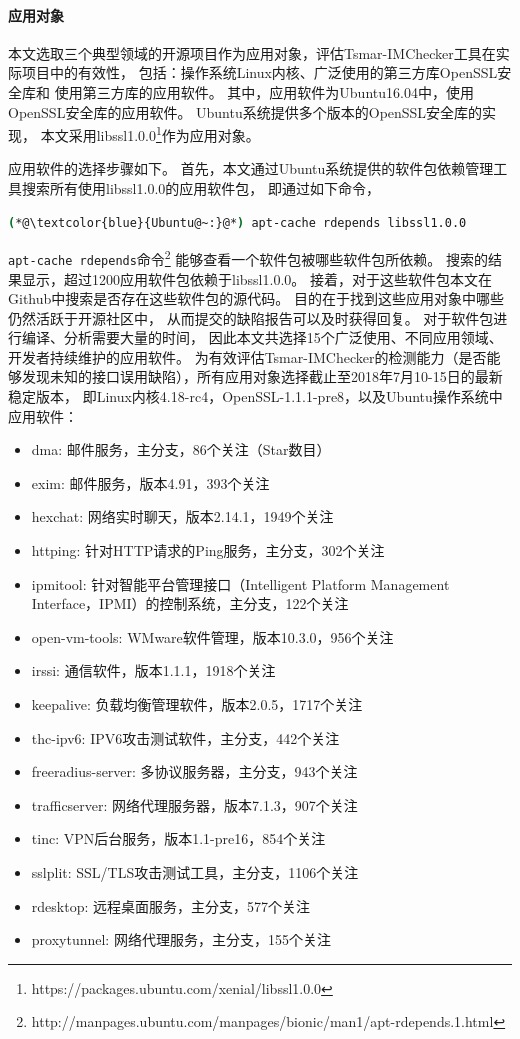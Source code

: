 \paragraph{应用对象}
本文选取三个典型领域的开源项目作为应用对象，评估Tsmar-IMChecker工具在实际项目中的有效性，
包括：操作系统Linux内核、广泛使用的第三方库OpenSSL安全库和
使用第三方库的应用软件。
其中，应用软件为Ubuntu16.04中，使用OpenSSL安全库的应用软件。
Ubuntu系统提供多个版本的OpenSSL安全库的实现，
本文采用libssl1.0.0\footnote{https://packages.ubuntu.com/xenial/libssl1.0.0}作为应用对象。

应用软件的选择步骤如下。
首先，本文通过Ubuntu系统提供的软件包依赖管理工具搜索所有使用libssl1.0.0的应用软件包，
即通过如下命令，
\begin{lstlisting}[language={bash},
basicstyle=\linespread{0.8}\listingsfont,
numbers=none,
xleftmargin=.25\textwidth]
(*@\textcolor{blue}{Ubuntu@~:}@*) apt-cache rdepends libssl1.0.0
\end{lstlisting}
\texttt{apt-cache rdepends}命令\footnote{http://manpages.ubuntu.com/manpages/bionic/man1/apt-rdepends.1.html}
能够查看一个软件包被哪些软件包所依赖。
搜索的结果显示，超过1200应用软件包依赖于libssl1.0.0。
接着，对于这些软件包本文在Github中搜索是否存在这些软件包的源代码。
目的在于找到这些应用对象中哪些仍然活跃于开源社区中，
从而提交的缺陷报告可以及时获得回复。
对于软件包进行编译、分析需要大量的时间，
因此本文共选择15个广泛使用、不同应用领域、开发者持续维护的应用软件。
为有效评估Tsmar-IMChecker的检测能力（是否能够发现未知的接口误用缺陷），所有应用对象选择截止至2018年7月10-15日的最新稳定版本，
即Linux内核4.18-rc4，OpenSSL-1.1.1-pre8，以及Ubuntu操作系统中应用软件：
\begin{itemize}
	\item dma: 邮件服务，主分支，86个关注（Star数目）
	\item exim: 邮件服务，版本4.91，393个关注
	\item hexchat: 网络实时聊天，版本2.14.1，1949个关注
	\item httping: 针对HTTP请求的Ping服务，主分支，302个关注
	\item ipmitool: 针对智能平台管理接口（Intelligent Platform Management Interface，IPMI）的控制系统，主分支，122个关注
	\item open-vm-tools: WMware软件管理，版本10.3.0，956个关注
	\item irssi: 通信软件，版本1.1.1，1918个关注
	\item keepalive: 负载均衡管理软件，版本2.0.5，1717个关注
	\item thc-ipv6: IPV6攻击测试软件，主分支，442个关注
	\item freeradius-server: 多协议服务器，主分支，943个关注
	\item trafficserver: 网络代理服务器，版本7.1.3，907个关注
	\item tinc: VPN后台服务，版本1.1-pre16，854个关注
	\item sslplit: SSL/TLS攻击测试工具，主分支，1106个关注
	\item rdesktop: 远程桌面服务，主分支，577个关注
	\item proxytunnel: 网络代理服务，主分支，155个关注
\end{itemize}

